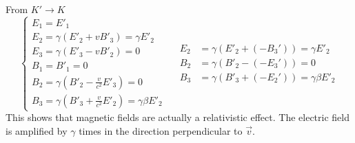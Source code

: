 \documentclass{article}
\begin{document}
	From $K' \to K$
	\[
	\begin{cases}
		E_1 = E'_1 \\
		E_2 = \gamma(E'_2 + vB'_3) = \gamma E'_2 \\
		E_3 = \gamma(E'_3 - vB'_2) = 0 \\
		B_1 = B'_1 = 0 \\
		B_2 = \gamma(B'_2 - \frac{v}{c^2}E'_3) = 0 \\
		B_3 = \gamma(B'_3 + \frac{v}{c^2}E'_2) = \gamma \beta E'_2
	\end{cases}
	\quad
	\begin{aligned}
		E_2 &= \gamma(E'_2+(-B_3')) = \gamma E'_2 \\
		B_2 &= \gamma(B'_2 - (-E_3')) = 0 \\
		B_3 &= \gamma(B'_3 + (-E_2')) = \gamma\beta E'_2
	\end{aligned}
	\]
	This shows that magnetic fields are actually a relativistic effect.
	The electric field is amplified by $\gamma$ times in the direction perpendicular to $\vec{v}$.
	
\end{document}
